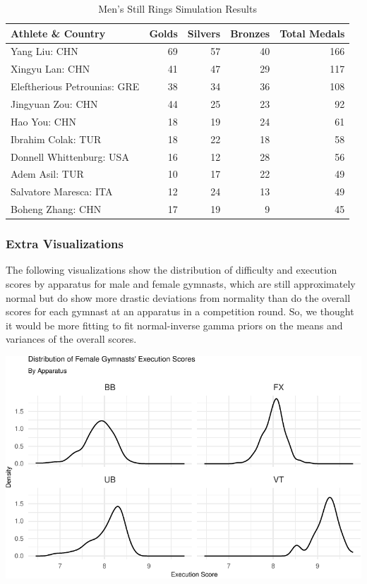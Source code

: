\documentclass[
  10.5pt,
  letterpaper,
  DIV=11,
  numbers=noendperiod]{scrartcl}
\begin{document}
\begin{table}[H]

\caption{Men's Still Rings Simulation Results }
\centering
\fontsize{9}{11}\selectfont
\begin{tabular}[t]{l|r|r|r|r}
\hline
Athlete \& Country & Golds & Silvers & Bronzes & Total Medals\\
\hline
Yang Liu: CHN & 69 & 57 & 40 & 166\\
\hline
Xingyu Lan: CHN & 41 & 47 & 29 & 117\\
\hline
Eleftherious Petrounias: GRE & 38 & 34 & 36 & 108\\
\hline
Jingyuan Zou: CHN & 44 & 25 & 23 & 92\\
\hline
Hao You: CHN & 18 & 19 & 24 & 61\\
\hline
Ibrahim Colak: TUR & 18 & 22 & 18 & 58\\
\hline
Donnell Whittenburg: USA & 16 & 12 & 28 & 56\\
\hline
Adem Asil: TUR & 10 & 17 & 22 & 49\\
\hline
Salvatore Maresca: ITA & 12 & 24 & 13 & 49\\
\hline
Boheng Zhang: CHN & 17 & 19 & 9 & 45\\
\hline
\end{tabular}
\end{table}

\hypertarget{extra-visualizations}{%
\subsubsection{Extra Visualizations}\label{extra-visualizations}}

The following visualizations show the distribution of difficulty and
execution scores by apparatus for male and female gymnasts, which are
still approximately normal but do show more drastic deviations from
normality than do the overall scores for each gymnast at an apparatus in
a competition round. So, we thought it would be more fitting to fit
normal-inverse gamma priors on the means and variances of the overall
scores.

\includegraphics{Main_files/figure-pdf/execution-difficulty-distributions-1.pdf}
\end{document}
